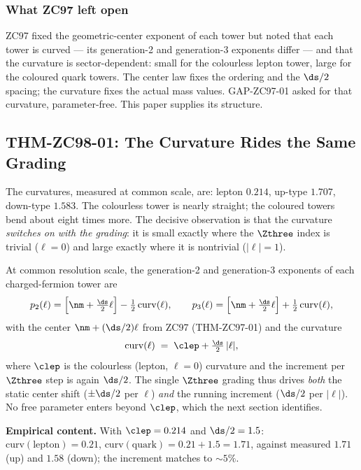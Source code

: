 \documentclass[12pt, a4paper]{article}
\begin{document}
\subsubsection{What ZC97 left open}

ZC97 fixed the geometric-center exponent of each tower but noted that each tower
is curved --- its generation-2 and generation-3 exponents differ --- and that
the curvature is sector-dependent: small for the colourless lepton tower, large
for the coloured quark towers. The center law fixes the ordering and the $\ds/2$
spacing; the curvature fixes the actual mass values. GAP-ZC97-01 asked for that
curvature, parameter-free. This paper supplies its structure.

\subsection{THM-ZC98-01: The Curvature Rides the Same Grading}
\label{sec:closure-zc98}

The curvatures, measured at common scale, are: lepton $0.214$, up-type $1.707$,
down-type $1.583$. The colourless tower is nearly straight; the coloured towers
bend about eight times more. The decisive observation is that the curvature
\emph{switches on with the grading}: it is small exactly where the $\Zthree$
index is trivial ($\ell=0$) and large exactly where it is nontrivial
($|\ell|=1$).

\begin{formalbox}[title={THM-ZC98-01: Spectral Closure (structural)}]
At common resolution scale, the generation-2 and generation-3 exponents of each
charged-fermion tower are
\[
  p_{2}(\ell)=\Big[\nm+\tfrac{\ds}{2}\ell\Big]-\tfrac12\,\mathrm{curv}(\ell),
  \qquad
  p_{3}(\ell)=\Big[\nm+\tfrac{\ds}{2}\ell\Big]+\tfrac12\,\mathrm{curv}(\ell),
\]
with the center $\nm+(\ds/2)\ell$ from ZC97 (THM-ZC97-01) and the curvature
\[
  \mathrm{curv}(\ell)\;=\;\clep+\tfrac{\ds}{2}\,|\ell|,
\]
where $\clep$ is the colourless (lepton, $\ell=0$) curvature and the increment
per $\Zthree$ step is again $\ds/2$. The single $\Zthree$ grading thus drives
\emph{both} the static center shift ($\pm\ds/2$ per $\ell$) \emph{and} the
running increment ($\ds/2$ per $|\ell|$). No free parameter enters beyond
$\clep$, which the next section identifies.

\textbf{Empirical content.} With $\clep=0.214$ and $\ds/2=1.5$:
$\mathrm{curv}(\text{lepton})=0.21$, $\mathrm{curv}(\text{quark})=0.21+1.5=1.71$,
against measured $1.71$ (up) and $1.58$ (down); the increment matches to
$\sim5\%$.
\end{formalbox}
\end{document}
